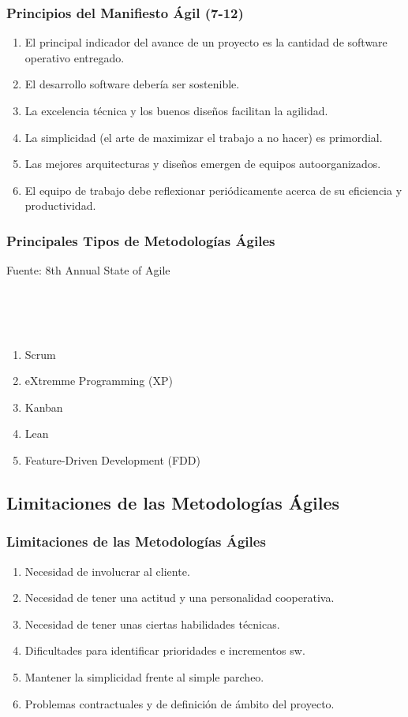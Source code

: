 \documentclass[animated,a4paper,slidestop,xcolor=pst,blue]{beamer}
\begin{document}
\begin{frame}[c]
	\frametitle{Principios del Manifiesto Ágil (7-12)}
	\begin{enumerate}[<+->]
		\item El principal indicador del avance de un proyecto es la cantidad de software operativo entregado.
		\item El desarrollo software debería ser sostenible.
		\item La excelencia técnica y los buenos diseños facilitan la agilidad.
		\item La simplicidad (el arte de maximizar el trabajo a no hacer) es primordial.
        \item Las mejores arquitecturas y diseños emergen de equipos autoorganizados.
        \item El equipo de trabajo debe reflexionar periódicamente acerca de su eficiencia y productividad.
	\end{enumerate}
\end{frame}

\begin{frame}[t]
	\frametitle{Principales Tipos de Metodologías Ágiles}
    \begin{flushright}
        {\scriptsize Fuente: 8th Annual State of Agile}
    \end{flushright}
    \ \\ \ \\ \ \\
	\begin{enumerate}[<+->]
        \item Scrum
		\item eXtremme Programming (XP)
        \item Kanban
        \item Lean
        \item Feature-Driven Development (FDD)
	\end{enumerate}
\end{frame}

\subsection{Limitaciones de las Metodologías Ágiles}

\begin{frame}[c]
	\frametitle{Limitaciones de las Metodologías Ágiles}
	\begin{enumerate}[<+->]
		\item Necesidad de involucrar al cliente.
        \item Necesidad de tener una actitud y una personalidad cooperativa.
        \item Necesidad de tener unas ciertas habilidades técnicas.
        \item Dificultades para identificar prioridades e incrementos sw.
        \item Mantener la simplicidad frente al simple parcheo.
        \item Problemas contractuales y de definición de ámbito del proyecto.
	\end{enumerate}
\end{frame}
\end{document}
